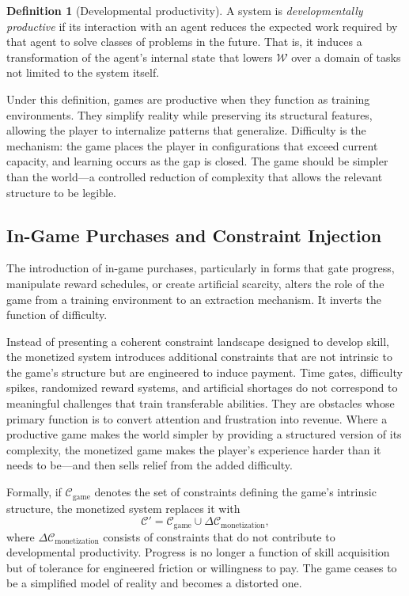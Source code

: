 \documentclass[12pt, oneside]{article}
\theoremstyle{definition}
\newtheorem{definition}{Definition}[section]
\newcommand{\Wfunc}{\mathcal{W}}
\begin{document}
\begin{definition}[Developmental productivity]
A system is \emph{developmentally productive} if its interaction with an agent reduces the expected work required by that agent to solve classes of problems in the future. That is, it induces a transformation of the agent's internal state that lowers $\Wfunc$ over a domain of tasks not limited to the system itself.
\end{definition}

Under this definition, games are productive when they function as training environments. They simplify reality while preserving its structural features, allowing the player to internalize patterns that generalize. Difficulty is the mechanism: the game places the player in configurations that exceed current capacity, and learning occurs as the gap is closed. The game should be simpler than the world---a controlled reduction of complexity that allows the relevant structure to be legible.

\subsection{In-Game Purchases and Constraint Injection}

The introduction of in-game purchases, particularly in forms that gate progress, manipulate reward schedules, or create artificial scarcity, alters the role of the game from a training environment to an extraction mechanism. It inverts the function of difficulty.

Instead of presenting a coherent constraint landscape designed to develop skill, the monetized system introduces additional constraints that are not intrinsic to the game's structure but are engineered to induce payment. Time gates, difficulty spikes, randomized reward systems, and artificial shortages do not correspond to meaningful challenges that train transferable abilities. They are obstacles whose primary function is to convert attention and frustration into revenue. Where a productive game makes the world simpler by providing a structured version of its complexity, the monetized game makes the player's experience harder than it needs to be---and then sells relief from the added difficulty.

Formally, if $\mathcal{C}_{\mathrm{game}}$ denotes the set of constraints defining the game's intrinsic structure, the monetized system replaces it with
\[
  \mathcal{C}' = \mathcal{C}_{\mathrm{game}} \cup \Delta\mathcal{C}_{\mathrm{monetization}},
\]
where $\Delta\mathcal{C}_{\mathrm{monetization}}$ consists of constraints that do not contribute to developmental productivity. Progress is no longer a function of skill acquisition but of tolerance for engineered friction or willingness to pay. The game ceases to be a simplified model of reality and becomes a distorted one.
\end{document}

